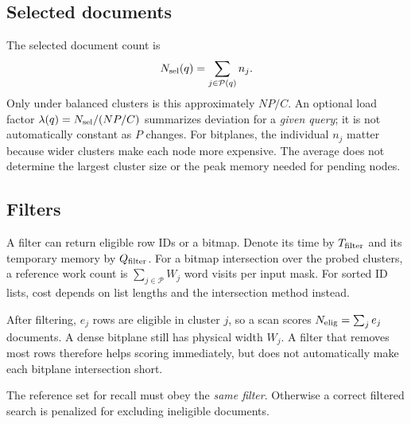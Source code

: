 \subsection{Selected documents}
The selected document count is
\begin{equation}
N_{\mathrm{sel}}(q)=\sum_{j\in\mathcal P(q)}n_j.
\label{eq:selected}
\end{equation}
Only under balanced clusters is this approximately $NP/C$. An optional load factor
$\lambda(q)=N_{\mathrm{sel}}/(NP/C)$ summarizes deviation for a \emph{given query}; it is not automatically
constant as $P$ changes. For bitplanes, the individual $n_j$ matter because wider clusters
make each node more expensive. The average does not determine the largest cluster size or
the peak memory needed for pending nodes.

\subsection{Filters}
A filter can return eligible row IDs or a bitmap. Denote its time by $T_{\rm filter}$ and
its temporary memory by $Q_{\rm filter}$. For a bitmap intersection over the probed clusters, a reference
work count is $\sum_{j\in\mathcal P}W_j$ word visits per input mask. For sorted ID lists, cost
depends on list lengths and the intersection method instead.

After filtering, $e_j$ rows are eligible in cluster $j$, so a scan scores
$N_{\mathrm{elig}}=\sum_j e_j$ documents. A dense bitplane still has physical width $W_j$. A filter that
removes most rows therefore helps scoring immediately, but does not automatically make each
bitplane intersection short.

The reference set for recall must obey the \emph{same filter}. Otherwise a correct filtered
search is penalized for excluding ineligible documents.


